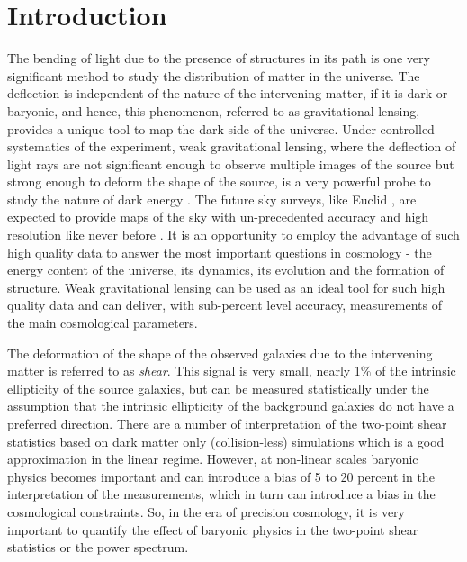 \documentclass[
  11pt,
  twoside,
  openright,
  titlepage,
  headings=optiontoheadandtoc
]{scrbook}
\begin{document}
\section{Introduction}
\label{p3:sec:intro}

The bending of light due to the presence of structures in its path is one very significant method to study the distribution of matter in the universe. The deflection is independent of the nature of the intervening matter, if it is dark or baryonic, and hence, this phenomenon, referred to as gravitational lensing, provides a unique tool to map the dark side of the universe. Under controlled systematics of the experiment, weak gravitational lensing, where the deflection of light rays are not significant enough to observe multiple images of the source but strong enough to deform the shape of the source, is a very powerful probe to study the nature of dark energy \citep{2006astro.ph..9591A}. The future sky surveys, like Euclid \citep{2011arXiv1110.3193L, 2009ExA....23...17R, 2009ExA....23...39C}, are expected to provide maps of the sky with un-precedented accuracy and high resolution like never before \citep{2013LRR....16....6A}. It is an opportunity  to employ the advantage of such high quality data to answer the most important questions in cosmology - the energy content of the universe, its dynamics, its evolution and the formation of structure. Weak gravitational lensing can be used as an ideal tool for such high quality data and can deliver, with sub-percent level accuracy, measurements of the main cosmological parameters.

The deformation of the shape of the observed galaxies due to the intervening matter is referred to as {\it shear}. This signal is very small, nearly 1$\%$ of the intrinsic ellipticity of the source galaxies, but can be measured statistically under the assumption that the intrinsic ellipticity of the background galaxies do not have a preferred direction. There are a number of interpretation of the two-point shear statistics based on dark matter only (collision-less) simulations which is a good approximation in the linear regime. However, at non-linear scales baryonic physics becomes important and can introduce a bias of 5 to 20 percent in the interpretation of the measurements, which in turn can introduce a bias in the cosmological constraints. So, in the era of precision cosmology, it is very important to quantify the effect of baryonic physics in the two-point shear statistics or the power spectrum.
\end{document}
